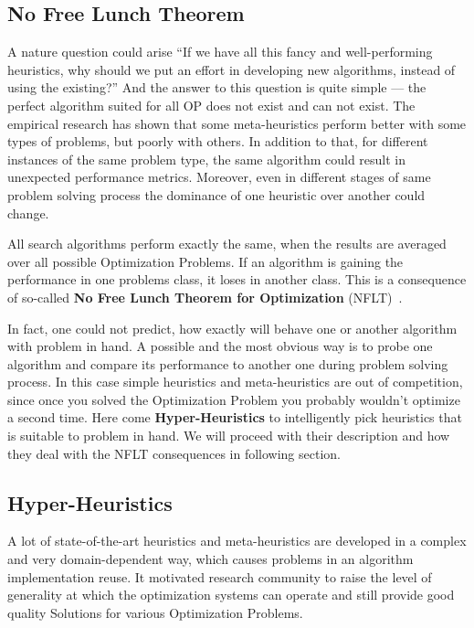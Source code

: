 \subsection{No Free Lunch Theorem}
A nature question could arise ``If we have all this fancy and well-performing heuristics, why should we put an effort in developing new algorithms, instead of using the existing?'' And the answer to this question is quite simple — the perfect algorithm suited for all OP does not exist and can not exist. 
The empirical research has shown that some meta-heuristics perform better with some types of problems, but poorly with others. In addition to that, for different instances of the same problem type, the same algorithm could result in unexpected performance metrics. Moreover, even in different stages of same problem solving process the dominance of one heuristic over another could change. 

All search algorithms perform exactly the same, when the results are averaged over all possible Optimization Problems. If an algorithm is gaining the performance in one problems class, it loses in another class. This is a consequence of so-called \textbf{No Free Lunch Theorem for Optimization} (NFLT)~\cite{wolpert1997no}.

In fact, one could not predict, how exactly will behave one or another algorithm with problem in hand. A possible and the most obvious way is to probe one algorithm and compare its performance to another one during problem solving process. In this case simple heuristics and meta-heuristics are out of competition, since once you solved the Optimization Problem you probably wouldn't optimize a second time.
Here come \textbf{Hyper-Heuristics} to intelligently pick heuristics that is suitable to problem in hand. We will proceed with their description and how they deal with the NFLT consequences in following section.


\subsection{Hyper-Heuristics}\label{bg: hh}
A lot of state-of-the-art heuristics and meta-heuristics are developed in a complex and very domain-dependent way, which causes problems in an algorithm implementation reuse. It motivated research community to raise the level of generality at which the optimization systems can operate and still provide good quality Solutions for various Optimization Problems. 

